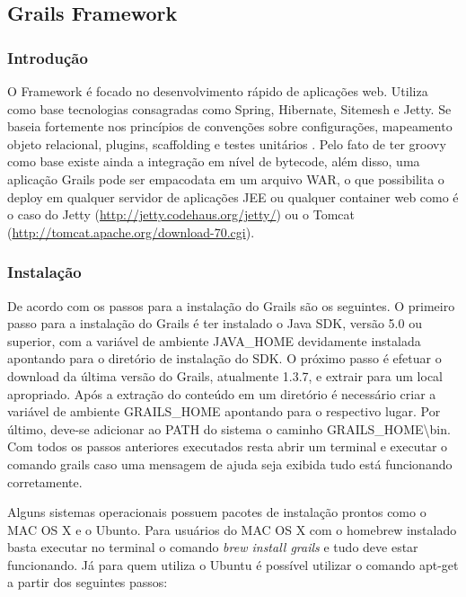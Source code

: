\documentclass[12pt]{article}
\begin{document}
\subsection{Grails Framework}

\subsubsection{Introdução}

    O Framework é focado no desenvolvimento rápido de aplicações web. Utiliza como
    base tecnologias consagradas como Spring, Hibernate, Sitemesh e Jetty. Se baseia 
    fortemente nos princípios de convenções sobre configurações, mapeamento objeto
    relacional, plugins, scaffolding e testes unitários \cite{beginingGroovy:2008}.
    Pelo fato de ter groovy como base existe ainda a integração em nível de bytecode,
    além disso, uma aplicação Grails pode ser empacodata em um arquivo WAR, o que 
    possibilita o deploy em qualquer servidor de aplicações JEE ou qualquer
    container web como é o caso do Jetty (\url{http://jetty.codehaus.org/jetty/})
    ou o Tomcat (\url{http://tomcat.apache.org/download-70.cgi}).
    
\subsubsection{Instalação}
    
    De acordo com \cite{grails} os passos para a instalação do Grails são os seguintes.
    O primeiro passo para a instalação do Grails é ter instalado o Java SDK, 
    versão 5.0 ou superior, com a variável de ambiente JAVA\_HOME devidamente 
    instalada apontando para o diretório de instalação do SDK. O próximo passo 
    é efetuar o download da última versão do Grails, atualmente 1.3.7, e extrair
    para um local apropriado. Após a extração do conteúdo em um diretório é necessário
    criar a variável de ambiente GRAILS\_HOME apontando para o respectivo lugar.
    Por último, deve-se adicionar ao PATH do sistema o caminho GRAILS\_HOME\textbackslash{}bin.
    Com todos os passos anteriores executados resta abrir um terminal e executar 
    o comando grails caso uma mensagem de ajuda seja exibida tudo está funcionando
    corretamente. 

    Alguns sistemas operacionais possuem pacotes de instalação prontos como o MAC
    OS X e o Ubunto. Para usuários do MAC OS X com o homebrew instalado basta executar
    no terminal o comando \emph{brew install grails} e tudo deve estar funcionando. Já 
    para quem utiliza o Ubuntu é possível utilizar o comando apt-get a partir dos 
    seguintes passos:
    
\end{document}

